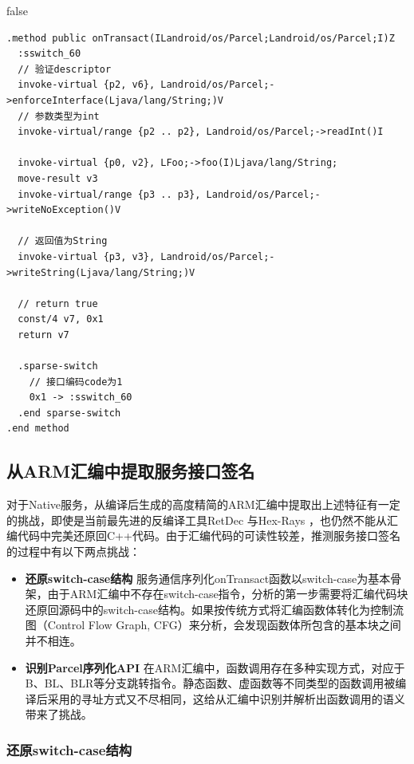 \documentclass[winfonts,master,twoside]{njuthesis}
\begin{document}
\if false
\begin{lstlisting}[caption={Java服务通信函数字节码},label={lst:transact_smali_example},basicstyle=\scriptsize]
.method public onTransact(ILandroid/os/Parcel;Landroid/os/Parcel;I)Z
  :sswitch_60
  // 验证descriptor
  invoke-virtual {p2, v6}, Landroid/os/Parcel;->enforceInterface(Ljava/lang/String;)V
  // 参数类型为int
  invoke-virtual/range {p2 .. p2}, Landroid/os/Parcel;->readInt()I
  
  invoke-virtual {p0, v2}, LFoo;->foo(I)Ljava/lang/String;
  move-result v3
  invoke-virtual/range {p3 .. p3}, Landroid/os/Parcel;->writeNoException()V
  
  // 返回值为String
  invoke-virtual {p3, v3}, Landroid/os/Parcel;->writeString(Ljava/lang/String;)V
  
  // return true
  const/4 v7, 0x1
  return v7

  .sparse-switch
    // 接口编码code为1
    0x1 -> :sswitch_60
  .end sparse-switch
.end method
\end{lstlisting}
\fi

\subsection{从ARM汇编中提取服务接口签名}

对于Native服务，从编译后生成的高度精简的ARM汇编中提取出上述特征有一定的挑战，即使是当前最先进的反编译工具RetDec \cite{retdec}与Hex-Rays \cite{hexrays}，也仍然不能从汇编代码中完美还原回C++代码。由于汇编代码的可读性较差，推测服务接口签名的过程中有以下两点挑战：
\begin{itemize}
	\item \textbf{还原switch-case结构} \quad 服务通信序列化onTransact函数以switch-case为基本骨架，由于ARM汇编中不存在switch-case指令，分析的第一步需要将汇编代码块还原回源码中的switch-case结构。如果按传统方式将汇编函数体转化为控制流图（Control Flow Graph, CFG）来分析，会发现函数体所包含的基本块之间并不相连。
    \item \textbf{识别Parcel序列化API} \quad 在ARM汇编中，函数调用存在多种实现方式，对应于B、BL、BLR等分支跳转指令。静态函数、虚函数等不同类型的函数调用被编译后采用的寻址方式又不尽相同，这给从汇编中识别并解析出函数调用的语义带来了挑战。
\end{itemize}

\subsubsection{还原switch-case结构}
\end{document}

